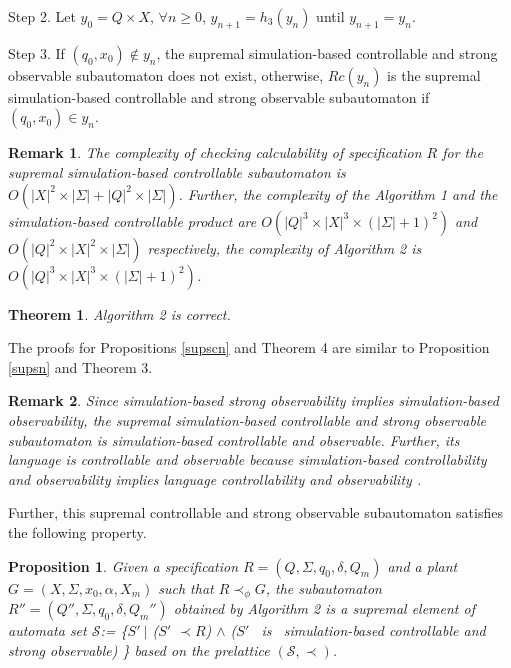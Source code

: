 \documentclass[12pt,draftcls,onecolumn]{IEEEtran}
\newtheorem{Theorem}{Theorem}
\newtheorem{Proposition}{Proposition}
\newtheorem{Remark}{Remark}
\begin{document}
Step 2. Let $y_{0} = Q \times X$, $\forall n \geq 0$, $y_{n+1} =
h_{3}(y_{n})$ until $y_{n+1} = y_n$.

Step 3. If $(q_0, x_0) \notin y_n$, the supremal simulation-based
controllable and strong observable subautomaton does not exist,
otherwise, $Rc(y_n)$ is the supremal simulation-based controllable
and strong observable subautomaton if $(q_0, x_0) \in y_n$.



\begin{Remark}
The complexity of checking calculability of specification $R$ for
the supremal simulation-based controllable subautomaton is
$O(|X|^{2} \times |\Sigma| + |Q|^{2} \times |\Sigma|)$. Further,
the complexity of the Algorithm 1 and the simulation-based
controllable product are $O(|Q|^3\times |X|^3 \times
(|\Sigma|+1)^2)$ and $O(|Q|^2 \times |X|^2 \times |\Sigma|)$
respectively, the complexity of Algorithm 2 is $O(|Q|^3\times
|X|^3 \times (|\Sigma|+1)^2)$.
\end{Remark}



\begin{Theorem}
Algorithm 2 is correct.
\end{Theorem}

The proofs for Propositions \ref{supscn} and Theorem 4 are similar
to Proposition \ref{supsn} and Theorem 3.

\begin{Remark}
Since simulation-based strong observability implies
simulation-based observability, the supremal simulation-based
controllable and strong observable subautomaton is
simulation-based controllable and observable. Further, its
language is controllable and observable because simulation-based
controllability and observability implies language controllability
and observability \cite{liu}.
\end{Remark}


Further, this supremal controllable and strong observable
subautomaton satisfies the following property.



\begin{Proposition}\label{supa}
Given a specification $R=(Q, \Sigma, q_0, \delta, Q_m)$ and a
plant $G=(X, \Sigma, x_0, \alpha, X_m)$ such that $R\prec_{\phi}
G$, the subautomaton $R''=(Q'', \Sigma, q_0, \delta, Q_m'')$
obtained by Algorithm 2 is a supremal element of automata set
$\mathcal{S}$:= \{$S'~|$ ($S'$ $\prec R$) $\wedge$ ($S'$ ~is
~simulation-based controllable and strong observable) \} based on
the prelattice $(\mathcal{S}, \prec)$.
\end{Proposition}
\end{document}
